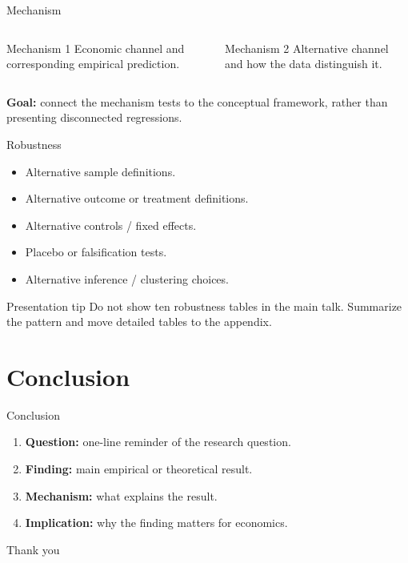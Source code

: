 \documentclass[10pt,aspectratio=169]{beamer}
\begin{document}
\begin{frame}{Mechanism}
\begin{columns}[T]
\begin{block}{Mechanism 1}
Economic channel and corresponding empirical prediction.
\end{block}

\begin{block}{Mechanism 2}
Alternative channel and how the data distinguish it.
\end{block}
\end{columns}

\vspace{1em}
\textbf{Goal:} connect the mechanism tests to the conceptual framework, rather than presenting disconnected regressions.
\end{frame}

\begin{frame}{Robustness}
\begin{itemize}
  \item Alternative sample definitions.
  \item Alternative outcome or treatment definitions.
  \item Alternative controls / fixed effects.
  \item Placebo or falsification tests.
  \item Alternative inference / clustering choices.
\end{itemize}

\vspace{0.7em}
\begin{block}{Presentation tip}
Do not show ten robustness tables in the main talk. Summarize the pattern and move detailed tables to the appendix.
\end{block}
\end{frame}

\section{Conclusion}

\begin{frame}{Conclusion}
\begin{enumerate}
  \item \textbf{Question:} one-line reminder of the research question.
  \item \textbf{Finding:} main empirical or theoretical result.
  \item \textbf{Mechanism:} what explains the result.
  \item \textbf{Implication:} why the finding matters for economics.
\end{enumerate}

\vspace{1em}
\centering
\Large Thank you
\end{frame}
\end{document}
